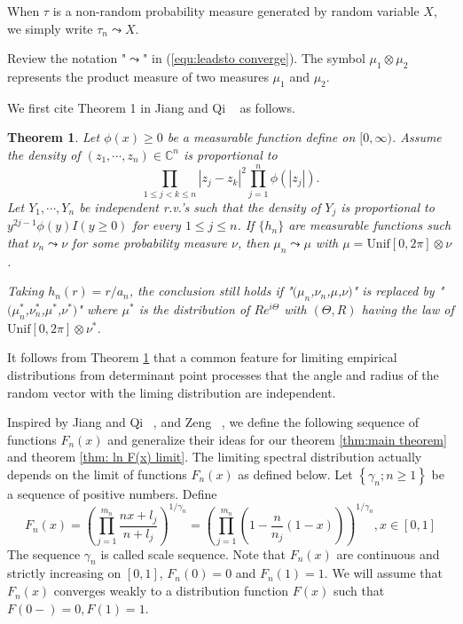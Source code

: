 \documentclass[12pt]{article}
\theoremstyle{plain}
\newtheorem{thm}{\textbf{Theorem}}
\theoremstyle{definition}
\theoremstyle{remark}
\begin{document}
When $\tau$ is a non-random probability measure generated by random variable $X$, we simply write $\tau_n\leadsto X$.

Review the notation "$\leadsto$" in (\ref{equ:leadsto converge}).
The symbol $\mu_1\otimes \mu_2$ represents the product measure of two measures $\mu_1$ and $\mu_2$.

We first cite Theorem 1 in Jiang and Qi ~\cite{JiangQi2019} as
follows.

\begin{thm}\label{thm:nonlinear}
Let $\phi(x)\geq 0$ be a measurable function define on $[0,\infty)$. Assume the density of $(z_1,\cdots,z_n)\in \mathbb{C}^n$ is proportional to $$\prod_{1\leq j<k\leq n} |z_j-z_k|^2\prod_{j=1}^n\phi (|z_j|).$$
Let $Y_1,\cdots,Y_n$ be independent r.v.'s such that the density of $Y_j$ is proportional to $y^{2j-1}\phi(y)I(y\geq 0)$ for every $1\leq j\leq n$. If $\{ h_n \}$ are measurable functions such that $\nu_n\leadsto \nu$ for some probability measure $\nu$, then $\mu_n\leadsto \mu$ with $\mu=\text{Unif}[0,2\pi]\otimes \nu$.

Taking $h_n(r)=r/a_n$, the conclusion still holds if "$(\mu_n$,$\nu_n$,$\mu$,$\nu)$" is replaced by "$(\mu_n^*$,$\nu_n^*$,$\mu^*$,$\nu^*)$" where $\mu^*$ is the distribution of $Re^{i\Theta}$ with $(\Theta,R)$ having the law of $\text{Unif}[0,2\pi]\otimes \nu^*$.
\end{thm}
It follows from Theorem \ref{thm:nonlinear} that a common feature for limiting empirical distributions from determinant point processes that the angle and radius of the random vector with the liming distribution are independent.

Inspired by Jiang and Qi ~\cite{JiangQi2019}, and Zeng
~\cite{zeng2016}, we define the following sequence of functions
$F_n(x)$ and generalize their ideas for our theorem \ref{thm:main
theorem} and theorem \ref{thm: ln F(x) limit}. The limiting spectral
distribution actually depends on the limit of functions $F_n(x)$ as
defined below. Let $\left\{\gamma_{n} ;  n \geq 1\right\}$ be a
sequence of positive numbers. Define 
\begin{equation}
    \label{equ:F_n}
    F_{n}(x)=\left(\prod_{j=1}^{m_n} \frac{nx+l_{j} }{n+l_{j}}\right)^{1 / \gamma_{n}}=
    \left(\prod_{j=1}^{m_n} (1-\frac{n}{n_j}(1-x))\right) ^{1 / \gamma_{n}},  x \in[0,1]
\end{equation}
The sequence  $\gamma_{n}$ is called scale sequence.
Note that $F_n(x)$ are continuous and strictly increasing on $[0,1]$, $F_{n}(0)=0$ and $F_{n}(1)=1$. We will assume that $F_n(x)$ converges weakly to a distribution function $F(x)$ such that $F(0-)=0, F(1)=1$.
\end{document}
